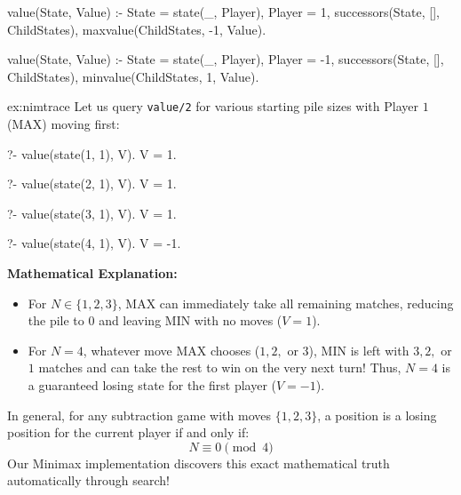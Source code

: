\begin{codeblock}
value(State, Value) :-
    State = state(_, Player),
    Player = 1,
    successors(State, [], ChildStates),
    maxvalue(ChildStates, -1, Value).

value(State, Value) :-
    State = state(_, Player),
    Player = -1,
    successors(State, [], ChildStates),
    minvalue(ChildStates, 1, Value).
\end{codeblock}


\newpage
\begin{example}{ex:nimtrace}
Let us query \texttt{value/2} for various starting pile sizes with Player $1$ (MAX) moving first:

\begin{codeblock}
?- value(state(1, 1), V).
V = 1.

?- value(state(2, 1), V).
V = 1.

?- value(state(3, 1), V).
V = 1.

?- value(state(4, 1), V).
V = -1.
\end{codeblock}

\textbf{Mathematical Explanation:}
\begin{itemize}
    \item For $N \in \{1, 2, 3\}$, MAX can immediately take all remaining matches, reducing the pile to $0$ and leaving MIN with no moves ($V = 1$).
    \item For $N = 4$, whatever move MAX chooses ($1, 2,$ or $3$), MIN is left with $3, 2,$ or $1$ matches and can take the rest to win on the very next turn! Thus, $N = 4$ is a guaranteed losing state for the first player ($V = -1$).
\end{itemize}
In general, for any subtraction game with moves $\{1, 2, 3\}$, a position is a losing position for the current player if and only if:
\[
N \equiv 0 \pmod 4
\]
Our Minimax implementation discovers this exact mathematical truth automatically through search!
\end{example}